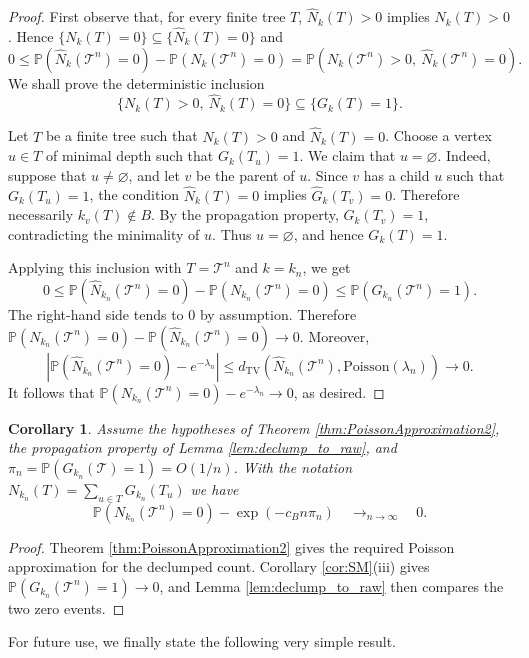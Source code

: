 \documentclass[a4paper,11pt]{article}
\newtheorem{corollary}[theorem]{Corollary}
\DeclareRobustCommand{\P}{\mathbb{P}}
\DeclareRobustCommand{\1}{\mathbf{1}}
\newcommand{\dTV}{d_{\mathrm{TV}}}
\newcommand{\Po}{\mathrm{Poisson}}
\begin{document}
\begin{proof}
First observe that, for every finite tree $T$, $\widehat{N}_k(T)>0$ implies
$N_k(T)>0$. Hence $\{N_k(T)=0\}\subseteq\{\widehat{N}_k(T)=0\}$ and
$$
0\le
\P(\widehat{N}_k(\mathcal T^n)=0)-\P(N_k(\mathcal T^n)=0)
=
\P(N_k(\mathcal T^n)>0,\ \widehat{N}_k(\mathcal T^n)=0).
$$
We shall prove the deterministic inclusion
$$
\{N_k(T)>0,\ \widehat{N}_k(T)=0\}\subseteq\{G_k(T)=1\}.
$$

Let $T$ be a finite tree such that $N_k(T)>0$ and $\widehat{N}_k(T)=0$. Choose a vertex
$u\in T$ of minimal depth such that $G_k(T_u)=1$. We claim that
$u=\varnothing$. Indeed, suppose that $u\neq\varnothing$, and let $v$ be the
parent of $u$. Since $v$ has a child $u$ such that $G_k(T_u)=1$, the condition
$\widehat{N}_k(T)=0$ implies $\widehat{G}_k(T_v)=0$. Therefore necessarily $k_v(T)\notin B$.
By the propagation property, $G_k(T_v)=1$, contradicting the minimality of
$u$. Thus $u=\varnothing$, and hence $G_k(T)=1$.

Applying this inclusion with $T=\mathcal T^n$ and $k=k_n$, we get
$$
0\le
\P(\widehat{N}_{k_n}(\mathcal T^n)=0)-\P(N_{k_n}(\mathcal T^n)=0)
\le
\P(G_{k_n}(\mathcal T^n)=1).
$$
The right-hand side tends to $0$ by assumption. Therefore $
\P(N_{k_n}(\mathcal T^n)=0)-\P(\widehat{N}_{k_n}(\mathcal T^n)=0)\to0$.
Moreover,
$$
\left|\P(\widehat{N}_{k_n}(\mathcal T^n)=0)-e^{-\lambda_n}\right|
\le
\dTV(\widehat{N}_{k_n}(\mathcal T^n),\Po(\lambda_n))
\to0.
$$
It follows that $
\P(N_{k_n}(\mathcal T^n)=0)-e^{-\lambda_n}\to0$,
as desired.
\end{proof}

\begin{corollary}
\label{cor:declump_zero}
Assume the hypotheses of Theorem \ref{thm:PoissonApproximation2}, the
propagation property of Lemma \ref{lem:declump_to_raw}, and
$\pi_n=\P(G_{k_n}(\mathcal T)=1)=O(1/n)$. With the notation
$
N_{k_n}(T)=\sum_{u\in T}G_{k_n}(T_u)$
we have
$$
\P(N_{k_n}(\mathcal T^n)=0)-\exp(-c_Bn\pi_n)  \quad \mathop{\longrightarrow}_{n \rightarrow \infty} \quad 0.
$$
\end{corollary}

\begin{proof}
Theorem \ref{thm:PoissonApproximation2} gives the required Poisson
approximation for the declumped count. Corollary
\ref{cor:SM}\textup{(iii)} gives
$\P(G_{k_n}(\mathcal T^n)=1)\to0$, and Lemma
\ref{lem:declump_to_raw} then compares the two zero events.
\end{proof}

For future use, we finally state the following very simple result.
\end{document}

